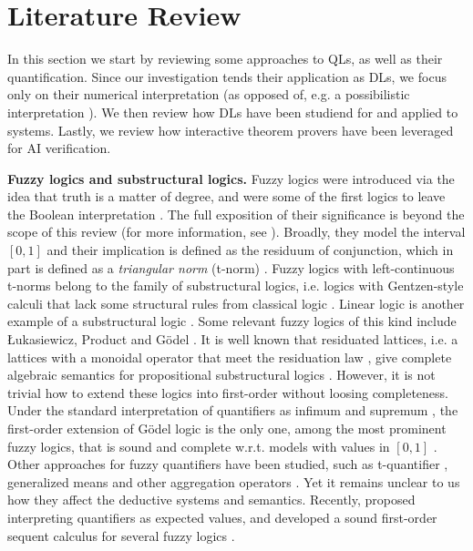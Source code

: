 \section{Literature Review} \label{section:LiteratureReview}

In this section we start by reviewing some approaches to QLs, as well as their quantification. Since our investigation tends their application as DLs, we focus only on their numerical interpretation (as opposed of, e.g. a possibilistic interpretation \citep{LIU19981}). %
We then review how DLs have been studiend for and applied to \InAI{} systems. Lastly, we review how interactive theorem provers have been leveraged for AI verification.

\textbf{Fuzzy logics and substructural logics.} Fuzzy logics were introduced via the idea that truth is a matter of degree, and were some of the first logics to leave the Boolean interpretation \citep{galatos2007residuated}. The full exposition of their significance is beyond the scope of this review (for more information, see \cite{cintula2011handbook, prooffuzzy}). Broadly, they model the interval $[0,1]$ and their implication is defined as the residuum of conjunction, which in part is defined as a \emph{triangular norm} (t-norm) \citep{cintula2011handbook,prooffuzzy}. Fuzzy logics with left-continuous t-norms belong to the family of substructural logics, i.e. logics with Gentzen-style calculi that lack some structural rules from classical logic \citep{galatos2007residuated}. Linear logic is another example of a substructural logic \citep{Wadler1993, agliano2025algebraic, galatos2007residuated}. Some relevant fuzzy logics of this kind include Łukasiewicz, Product and G\"{o}del \citep{cintula2011handbook,prooffuzzy}. It is well known that residuated lattices, i.e. a lattices with a monoidal operator that meet the residuation law \citep{galatos2007residuated}, give complete algebraic semantics for propositional substructural logics \citep{galatos2007residuated}. However, it is not trivial how to extend these logics into first-order without loosing completeness. Under the standard interpretation of quantifiers as infimum and supremum \citep{rescher1969many, cintula2011handbook}, the first-order extension of Gödel logic is the only one, among the most prominent fuzzy logics, that is sound and complete w.r.t. models with values in $[0,1]$ \citep{cintula2011handbook}. Other approaches for fuzzy quantifiers have been studied, such as t-quantifier \citep{LIU19981}, generalized means \citep{badreddine2022logic, slusarz2023logic} and other aggregation operators \citep{LIU19981}. Yet it remains unclear to us how they affect the deductive systems and semantics. Recently, \citeauthor{slusarz2023logic} proposed interpreting quantifiers as expected values, and developed a sound first-order sequent calculus for several fuzzy logics \citep{slusarz2023logic}.

